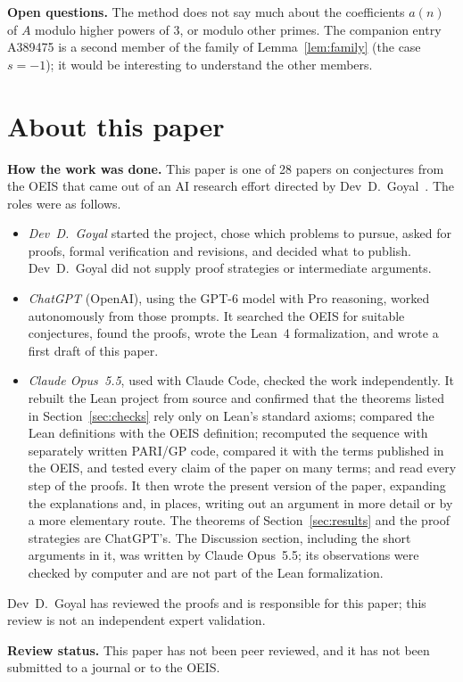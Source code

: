 \documentclass[11pt,a4paper]{article}
\theoremstyle{definition}
\theoremstyle{remark}
\newcommand{\para}[1]{\par\medskip\noindent\textbf{#1}\enspace}
\begin{document}
\para{Open questions.} The method does not say much about the coefficients $a(n)$ of $A$ modulo higher powers of $3$,
or modulo other primes. The companion entry A389475 is a second member of the family of Lemma~\ref{lem:family} (the case
$s=-1$); it would be interesting to understand the other members.

\section*{About this paper}\label{sec:about}
\para{How the work was done.}
This paper is one of 28 papers on conjectures from the OEIS that came out of an AI research effort directed by
Dev~D.~Goyal~\cite{repo}. The roles were as follows.
\begin{itemize}
\item \emph{Dev~D.~Goyal} started the project, chose which problems to pursue, asked for proofs, formal verification and
revisions, and decided what to publish. Dev~D.~Goyal did not supply proof strategies or intermediate arguments.
\item \emph{ChatGPT} (OpenAI), using the GPT-6 model with Pro reasoning, worked autonomously from those prompts. It
searched the OEIS for suitable conjectures, found the proofs, wrote the Lean~4 formalization, and wrote a first draft
of this paper.
\item \emph{Claude Opus~5.5}, used with Claude Code, checked the work independently. It rebuilt the Lean project from source and confirmed that the theorems listed in Section~\ref{sec:checks} rely only on
Lean's standard axioms; compared the Lean definitions with the OEIS definition; recomputed the sequence with separately
written PARI/GP code, compared it with the terms published in the OEIS, and tested every claim of the paper on many
terms; and read every step of the proofs. It then wrote the present version of the paper, expanding the
explanations and, in places, writing out an argument in more detail or by a more elementary route. The theorems of
Section~\ref{sec:results} and the proof strategies are ChatGPT's. The Discussion section, including the short arguments
in it, was written by Claude Opus~5.5; its observations were checked by computer and are not part of the Lean
formalization.
\end{itemize}
Dev~D.~Goyal has reviewed the proofs and is responsible for this paper; this review is not an independent expert
validation.

\para{Review status.} This paper has not been peer reviewed, and it has not been submitted to a journal or to the OEIS.
\end{document}
